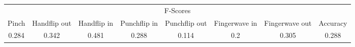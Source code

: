 \documentclass{standalone}
\begin{document}
 
 \begin{tabular}{|c|c|c|c|c|c|c ||c|}
\cline{1-8}\multicolumn{8}{|c|}{F-Scores} \\ 
\cline{1-8}Pinch & Handflip out & Handflip in & Punchflip in & Punchflip out & Fingerwave in & Fingerwave out & Accuracy\\ 
\cline{1-8}0.284 & 0.342 & 0.481 & 0.288 & 0.114 & 0.2 & 0.305 & 0.288\\ 
 \cline{1-8}\hline \end{tabular}
 
\end{document}
